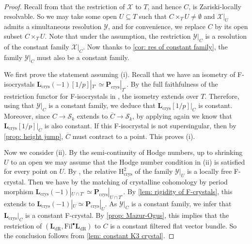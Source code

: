 \documentclass[11pt, letterpaper]{amsart}
\theoremstyle{plain}
\theoremstyle{definition}
\newcommand{\<}{\langle}
\renewcommand{\>}{\rangle}
\newcommand{\shS}{\mathscr{S}}
\newcommand{\sX}{\mathcal{X}}
\newcommand{\sY}{\mathcal{Y}}
\newcommand{\bL}{\mathbf{L}}
\renewcommand{\H}{\mathrm{H}}
\newcommand{\crys}{\mathrm{crys}}
\newcommand{\bP}{\mathbf{P}}
\newcommand{\dR}{\mathrm{dR}}
\newcommand{\Fil}{\mathrm{Fil}}
\begin{document}
\begin{proof}
    Recall from  that the restriction of $\sX$ to $T$, and hence $C$, is Zariski-locally resolvable. 
    So we may take some open $U \subseteq T$ such that $C \times_T U \neq \emptyset$ and $\sX|_U$ admits a simultaneous resolution $\sY$, and for convenience, we replace $C$ by its open subset $C \times_T U$. 
    Note that under the assumption, the restriction $\sY|_C$ is a resolution of the constant family $\sX|_C$. 
    Now thanks to \cref{cor: res of constant family}, the family $\sY|_C$ must also be a constant family.

    We first prove the statement assuming (i).
    Recall that we have an isometry of F-isocrystals $\bL_{\crys}(-1)[1/p]|_{T^\circ} \simeq \bP_\crys|_{T^\circ}$. 
    By the full faithfulness of the restriction functor for F-isocrystals in \cite[Thm.~2.2.3]{DK17}, the isometry extends over $T$. 
    Therefore, using that $\sY|_C$ is a constant family, we deduce that $\bL_{\crys}[1/p]|_C$ is constant. 
    Moreover, since $C \to \shS_k$ extends to $\overline{C} \to \shS_k$, by applying \cite[Thm.~2.2.3]{DK17} again we know that $\bL_{\crys}[1/p]|_{\overline{C}}$ is also constant. 
    If this F-isocrystal is not supersingular, then by \cref{prop: height jump}, $\overline{C}$ must contract to a point. This proves (i). 


    
    Now we consider (ii). 
    By the semi-continuity of Hodge numbers, up to shrinking $U$ to an open we may assume that the Hodge number condition in (ii) is satisfied for every point on $U$. 
    By , the relative $\H^2_\crys$ of the family $\sY|_U$ is a locally free F-crystal. Then we have by the matching of crystalline cohomology by period morphism $\bL_\crys(-1)|_{U \cap T^\circ} \simeq \bP_\crys|_{U \cap T^\circ}$. By \cref{lem: rigidity of F-crystals}, this extends to $\bL_\crys(-1) |_{U } \simeq \bP_\crys|_{U}$. 
    As $\sY|_C$ is a constant family, we infer that $\bL_\crys|_C$ is a constant F-crystal. 
    By \cref{prop: Mazur-Ogus}, this implies that the restriction of $(\bL_\dR, \Fil^\bullet \bL_\dR)$ to $C$ is a constant filtered flat vector bundle. 
    So the conclusion follows from \cref{lem: constant K3 crystal}.
\end{proof}
\end{document}
